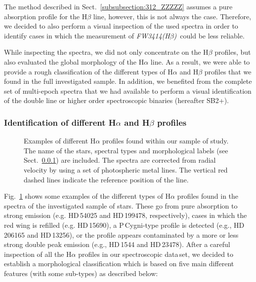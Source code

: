 \documentclass{aa}
\newcommand{\fwhb}{\textit{FW3414(H$\beta$)}}
\begin{document}
The method described in Sect.~\ref{subsubsection:312_ZZZZZ} assumes a pure absorption profile for the H$\beta$ line, however, this is not always the case. Therefore, we decided to also perform a visual inspection of the used spectra in order to identify cases in which the measurement of \fwhb\ could be less reliable. 

While inspecting the spectra, we did not only concentrate on the H$\beta$ profiles, but also evaluated the global morphology of the H$\alpha$ line. As a result, we were able to provide a rough classification of the different types of H$\alpha$ and H$\beta$ profiles that we found in the full investigated sample. In addition, we benefited from the complete set of multi-epoch spectra that we had available to perform a visual identification of the double line or higher order spectroscopic binaries (hereafter SB2+).

\subsubsection{\texorpdfstring{Identification of different H$\alpha$ and H$\beta$ profiles}{Identification of different Ha and Hb profiles}}
\label{subsubsection:321_FFFFFF} 

\begin{figure}[!t]
    \centering
    \caption{Examples of different H$\alpha$ profiles found within our sample of study. The name of the stars, spectral types and morphological labels (see Sect.~\ref{subsubsection:321_FFFFFF}) are included. The spectra are corrected from radial velocity by using a set of photospheric metal lines. The vertical red dashed lines indicate the reference position of the line.}
    \label{fig:ha_profiles}
\end{figure}

Fig.~\ref{fig:ha_profiles} shows some examples of the different types of H$\alpha$ profiles found in the spectra of the investigated sample of stars. These go from pure absorption to strong emission (e.g. HD\,54025 and HD\,199478, respectively), cases in which the red wing is refilled (e.g. HD\,15690), a P\,Cygni-type profile is detected (e.g., HD\,206165 and HD\,13256), or the profile appears contaminated by a more or less strong double peak emission (e.g., HD\,1544 and HD\,23478). After a careful inspection of all the H$\alpha$ profiles in our spectroscopic data\,set, we decided to establish a morphological classification which is based on five main different features (with some sub-types) as described below:
\end{document}
